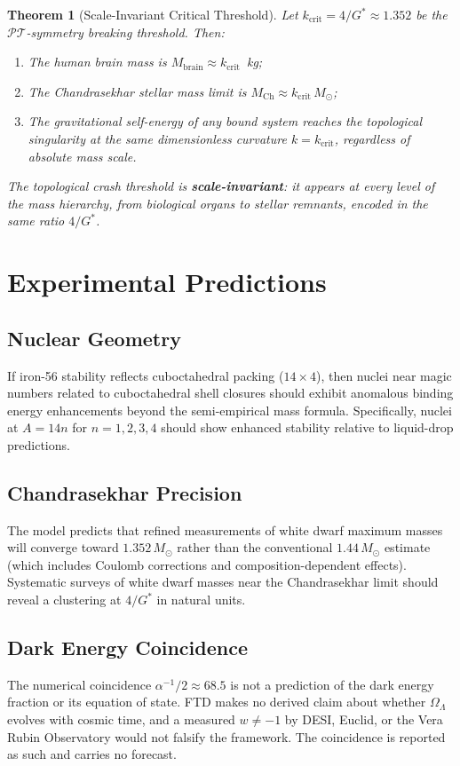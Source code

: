 \documentclass[11pt, letterpaper]{article}
\newcommand{\G}{G^*}
\newcommand{\PT}{\mathcal{PT}}
\newtheorem{theorem}{Theorem}[section]
\theoremstyle{definition}
\theoremstyle{remark}
\begin{document}
\begin{theorem}[Scale-Invariant Critical Threshold]
Let $k_{\text{crit}} = 4/\G \approx 1.352$ be the $\PT$-symmetry breaking threshold. Then:
\begin{enumerate}[label=(\roman*)]
    \item The human brain mass is $M_{\text{brain}} \approx k_{\text{crit}}$~kg;
    \item The Chandrasekhar stellar mass limit is $M_{\text{Ch}} \approx k_{\text{crit}}\,M_\odot$;
    \item The gravitational self-energy of any bound system reaches the topological singularity at the same dimensionless curvature $k = k_{\text{crit}}$, regardless of absolute mass scale.
\end{enumerate}
The topological crash threshold is \textbf{scale-invariant}: it appears at every level of the mass hierarchy, from biological organs to stellar remnants, encoded in the same ratio $4/\G$.
\end{theorem}

\section{Experimental Predictions}

\subsection{Nuclear Geometry}
If iron-56 stability reflects cuboctahedral packing ($14 \times 4$), then nuclei near magic numbers related to cuboctahedral shell closures should exhibit anomalous binding energy enhancements beyond the semi-empirical mass formula. Specifically, nuclei at $A = 14n$ for $n = 1, 2, 3, 4$ should show enhanced stability relative to liquid-drop predictions.

\subsection{Chandrasekhar Precision}
The model predicts that refined measurements of white dwarf maximum masses will converge toward $1.352\,M_\odot$ rather than the conventional $1.44\,M_\odot$ estimate (which includes Coulomb corrections and composition-dependent effects). Systematic surveys of white dwarf masses near the Chandrasekhar limit should reveal a clustering at $4/\G$ in natural units.

\subsection{Dark Energy Coincidence}
The numerical coincidence $\alpha^{-1}/2 \approx 68.5$ is not a prediction of the dark energy fraction or its equation of state. FTD makes no derived claim about whether $\Omega_\Lambda$ evolves with cosmic time, and a measured $w \neq -1$ by DESI, Euclid, or the Vera Rubin Observatory would not falsify the framework. The coincidence is reported as such and carries no forecast.
\end{document}
